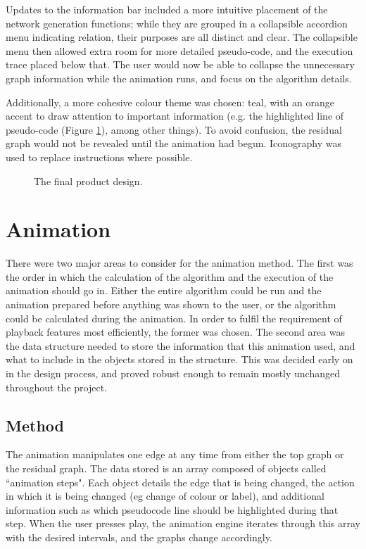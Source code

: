 \documentclass{l4proj}
\begin{document}
Updates to the information bar included a more intuitive placement of the network generation functions; while they are grouped in a collapsible accordion menu indicating relation, their purposes are all distinct and clear. The collapsible menu then allowed extra room for more detailed pseudo-code, and the execution trace placed below that. The user would now be able to collapse the unnecessary graph information while the animation runs, and focus on the algorithm details.

Additionally, a more cohesive colour theme was chosen: teal, with an orange accent to draw attention to important information (e.g. the highlighted line of pseudo-code (Figure \ref{fig:final-design}), among other things). To avoid confusion, the residual graph would not be revealed until the animation had begun. Iconography was used to replace instructions where possible.

\begin{figure}[h]
\centering
{}
\caption{The final product design.}
\label{fig:final-design}
\end{figure}

\newpage
\section{Animation}
There were two major areas to consider for the animation method. The first was the order in which the calculation of the algorithm and the execution of the animation should go in. Either the entire algorithm could be run and the animation prepared before anything was shown to the user, or the algorithm could be calculated during the animation. In order to fulfil the requirement of playback features most efficiently, the former was chosen. The second area was the data structure needed to store the information that this animation used, and what to include in the objects stored in the structure. This was decided early on in the design process, and proved robust enough to remain mostly unchanged throughout the project.

\subsection{Method}
The animation manipulates one edge at any time from either the top graph or the residual graph. The data stored is an array composed of objects called ``animation steps". Each object details the edge that is being changed, the action in which it is being changed (eg change of colour or label), and additional information such as which pseudocode line should be highlighted during that step. When the user presses play, the animation engine iterates through this array with the desired intervals, and the graphs change accordingly.
\end{document}
